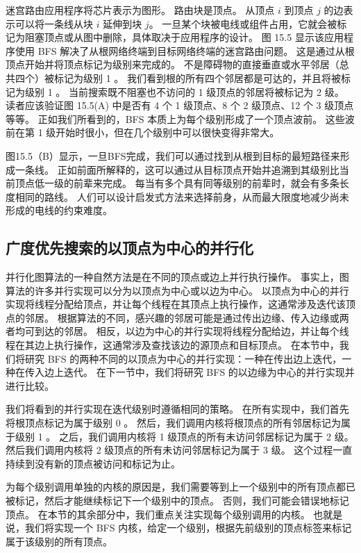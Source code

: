 迷宫路由应用程序将芯片表示为图形。 路由块是顶点。 从顶点 $i$ 到顶点 $j$ 的边表示可以将一条线从块 $i$ 延伸到块 $j$。 一旦某个块被电线或组件占用，它就会被标记为阻塞顶点或从图中删除，具体取决于应用程序的设计。 图 15.5 显示该应用程序使用 BFS 解决了从根网络终端到目标网络终端的迷宫路由问题。 这是通过从根顶点开始并将顶点标记为级别来完成的。 不是障碍物的直接垂直或水平邻居（总共四个）被标记为级别 1 。 我们看到根的所有四个邻居都是可达的，并且将被标记为级别 1 。 当前搜索既不阻塞也不访问的 1 级顶点的邻居将被标记为 2 级。 读者应该验证图 15.5(A) 中是否有 4 个 1 级顶点、8 个 2 级顶点、12 个 3 级顶点等等。 正如我们所看到的，BFS 本质上为每个级别形成了一个顶点波前。 这些波前在第 1 级开始时很小，但在几个级别中可以很快变得非常大。

图15.5（B）显示，一旦BFS完成，我们可以通过找到从根到目标的最短路径来形成一条线。 正如前面所解释的，这可以通过从目标顶点开始并追溯到其级别比当前顶点低一级的前辈来完成。 每当有多个具有同等级别的前辈时，就会有多条长度相同的路线。 人们可以设计启发式方法来选择前身，从而最大限度地减少尚未形成的电线的约束难度。

\subsection{广度优先搜索的以顶点为中心的并行化}
并行化图算法的一种自然方法是在不同的顶点或边上并行执行操作。 事实上，图算法的许多并行实现可以分为以顶点为中心或以边为中心。 以顶点为中心的并行实现将线程分配给顶点，并让每个线程在其顶点上执行操作，这通常涉及迭代该顶点的邻居。 根据算法的不同，感兴趣的邻居可能是通过传出边缘、传入边缘或两者均可到达的邻居。 相反，以边为中心的并行实现将线程分配给边，并让每个线程在其边上执行操作，这通常涉及查找该边的源顶点和目标顶点。 在本节中，我们将研究 BFS 的两种不同的以顶点为中心的并行实现：一种在传出边上迭代，一种在传入边上迭代。 在下一节中，我们将研究 BFS 的以边缘为中心的并行实现并进行比较。

我们将看到的并行实现在迭代级别时遵循相同的策略。 在所有实现中，我们首先将根顶点标记为属于级别 0 。 然后，我们调用内核将根顶点的所有邻居标记为属于级别 1 。 之后，我们调用内核将 1 级顶点的所有未访问邻居标记为属于 2 级。 然后我们调用内核将 2 级顶点的所有未访问邻居标记为属于 3 级。 这个过程一直持续到没有新的顶点被访问和标记为止。

为每个级别调用单独的内核的原因是，我们需要等到上一个级别中的所有顶点都已被标记，然后才能继续标记下一个级别中的顶点。 否则，我们可能会错误地标记顶点。 在本节的其余部分中，我们重点关注实现每个级别调用的内核。 也就是说，我们将实现一个 BFS 内核，给定一个级别，根据先前级别的顶点标签来标记属于该级别的所有顶点。

